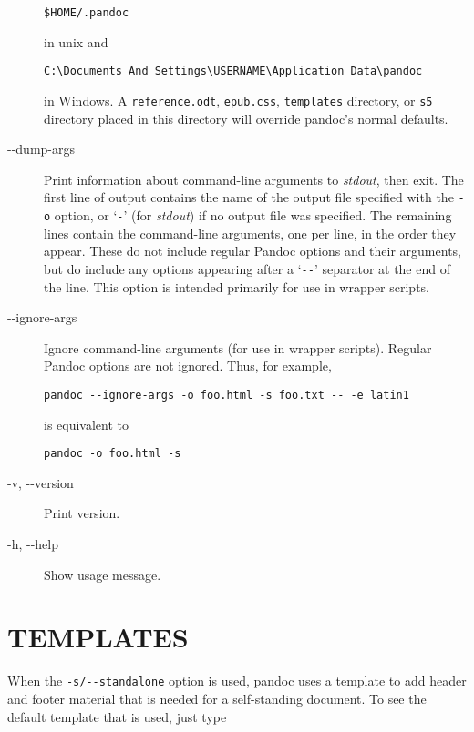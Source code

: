 \documentclass[
  12pt,
  a4paper,
]{article}
\begin{document}
\begin{description}
\begin{verbatim}
$HOME/.pandoc
\end{verbatim}

in unix and

\begin{verbatim}
C:\Documents And Settings\USERNAME\Application Data\pandoc
\end{verbatim}

in Windows. A \texttt{reference.odt}, \texttt{epub.css}, \texttt{templates}
directory, or \texttt{s5} directory placed in this directory will override
pandoc's normal defaults.
\item[-\/-dump-args]
Print information about command-line arguments to \emph{stdout}, then exit.
The first line of output contains the name of the output file specified with
the \texttt{-o} option, or `\texttt{-}' (for \emph{stdout}) if no output file
was specified. The remaining lines contain the command-line arguments, one per
line, in the order they appear. These do not include regular Pandoc options
and their arguments, but do include any options appearing after a
`\texttt{-\/-}' separator at the end of the line. This option is intended
primarily for use in wrapper scripts.
\item[-\/-ignore-args]
Ignore command-line arguments (for use in wrapper scripts). Regular Pandoc
options are not ignored. Thus, for example,

\begin{verbatim}
pandoc --ignore-args -o foo.html -s foo.txt -- -e latin1
\end{verbatim}

is equivalent to

\begin{verbatim}
pandoc -o foo.html -s
\end{verbatim}
\item[-v, -\/-version]
Print version.
\item[-h, -\/-help]
Show usage message.
\end{description}

\hypertarget{templates}{%
\section{TEMPLATES}\label{templates}}

When the \texttt{-s/-\/-standalone} option is used, pandoc uses a template to
add header and footer material that is needed for a self-standing document. To
see the default template that is used, just type
\end{document}
